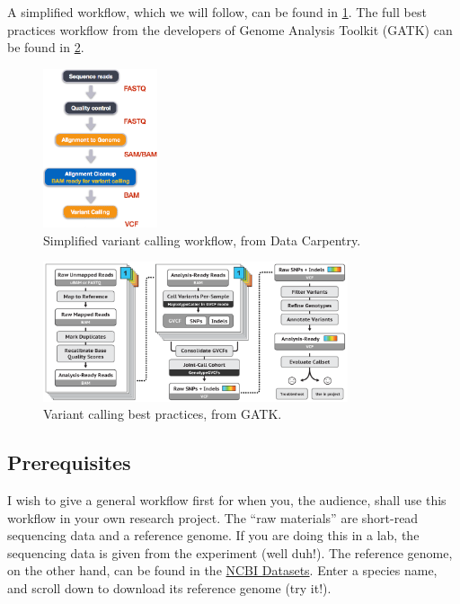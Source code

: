 \documentclass[12pt,letterpaper]{article}
\begin{document}
A simplified workflow, which we will follow, can be found in \cref*{fig:simplified-varcall-workflow}. The full best practices workflow from the developers of Genome Analysis Toolkit (GATK) can be found in \cref*{fig:gatk-varcall-workflow}.

\begin{figure}[H]
\centering
\includegraphics[width=0.3\textwidth]{data_carpentry_variant_calling_workflow.png}
\caption{Simplified variant calling workflow, from Data Carpentry.}
\label{fig:simplified-varcall-workflow}
\end{figure}

\begin{figure}[H]
\centering
\includegraphics[width=0.8\textwidth]{gatk_varcall_workflow.png}
\caption{Variant calling best practices, from GATK.}
\label{fig:gatk-varcall-workflow}
\end{figure}

\subsection{Prerequisites}

I wish to give a general workflow first for when you, the audience, shall use this workflow in your own research project. The ``raw materials'' are short-read sequencing data and a reference genome. If you are doing this in a lab, the sequencing data is given from the experiment (well duh!). The reference genome, on the other hand, can be found in the \href{https://www.ncbi.nlm.nih.gov/datasets/}{NCBI Datasets}. Enter a species name, and scroll down to download its reference genome (try it!).
\end{document}
